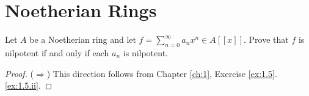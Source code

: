 \chapter{Noetherian Rings}
\label{ch:7}

\begin{exercise}
\label{ex:7.1}

\end{exercise}

\begin{exercise}
\label{ex:7.2}
Let $A$ be a Noetherian ring and let $f = \sum_{n=0}^\infty a_n x^n \in A[[x]]$.
Prove that $f$ is nilpotent if and only if each $a_n$ is nilpotent.
\end{exercise}

\begin{proof}
($\Rightarrow$) This direction follows from Chapter \ref{ch:1}, Exercise \ref{ex:1.5}.\ref{ex:1.5.ii}.


\end{proof}
